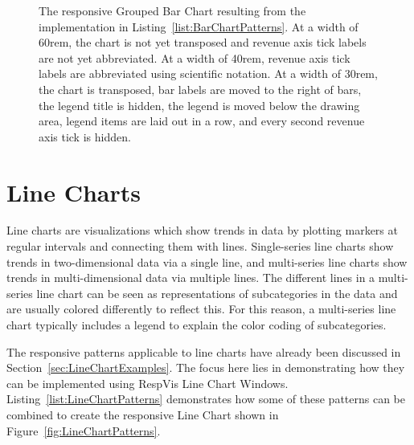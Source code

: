 \begin{figure}[tp]
{  \label{fig:BarChartPatterns30rem}%
}
\caption[Responsive RespVis Grouped Bar Chart]{%
The responsive Grouped Bar Chart resulting from the implementation in
Listing~\ref{list:BarChartPatterns}.
 At a width of 60rem, the chart is
not yet transposed and revenue axis tick labels are not yet
abbreviated.  At a width of 40rem,
revenue axis tick labels are abbreviated using scientific notation.
 At a width of 30rem, the chart is
transposed, bar labels are moved to the right of bars, the legend
title is hidden, the legend is moved below the drawing area, legend items
are laid out in a row, and every second revenue axis tick is hidden.
}
\label{fig:BarChartPatterns}
\end{figure}









\section{Line Charts}
\label{sec:LineChartsUsage}

Line charts are visualizations which show trends in data by plotting
markers at regular intervals and connecting them with lines.
Single-series line charts show trends in two-dimensional data via a
single line, and multi-series line charts show trends in
multi-dimensional data via multiple lines. The different lines in a
multi-series line chart can be seen as representations of
subcategories in the data and are usually colored differently to
reflect this. For this reason, a multi-series line chart typically
includes a legend to explain the color coding of subcategories.


The responsive patterns applicable to line charts have already been
discussed in Section~\ref{sec:LineChartExamples}. The focus here lies
in demonstrating how they can be implemented using RespVis Line Chart
Windows. Listing~\ref{list:LineChartPatterns} demonstrates how some of
these patterns can be combined to create the responsive Line Chart
shown in Figure~\ref{fig:LineChartPatterns}.


